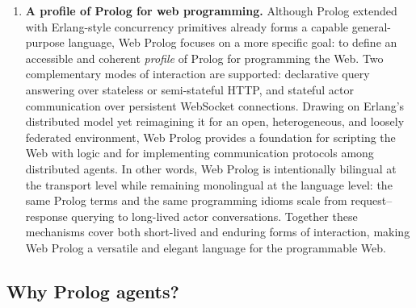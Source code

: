 \begin{enumerate}

\item \textbf{A profile of Prolog for web programming.}
Although Prolog extended with Erlang-style concurrency primitives already forms a capable general-purpose language, Web Prolog focuses on a more specific goal: to define an accessible and coherent \emph{profile} of Prolog for programming the Web. Two complementary modes of interaction are supported: declarative query answering over stateless or semi-stateful HTTP, and stateful actor communication over persistent WebSocket connections. Drawing on Erlang's distributed model yet reimagining it for an open, heterogeneous, and loosely federated environment, Web Prolog provides a foundation for scripting the Web with logic and for implementing communication protocols among distributed agents. In other words, Web Prolog is intentionally bilingual at the transport level while remaining monolingual at the language level: the same Prolog terms and the same programming idioms scale from request--response querying to long-lived actor conversations. Together these mechanisms cover both short-lived and enduring forms of interaction, making Web Prolog a versatile and elegant language for the programmable Web.

\end{enumerate}

\subsection{Why Prolog agents?}\label{sec:why-prolog-agents}

